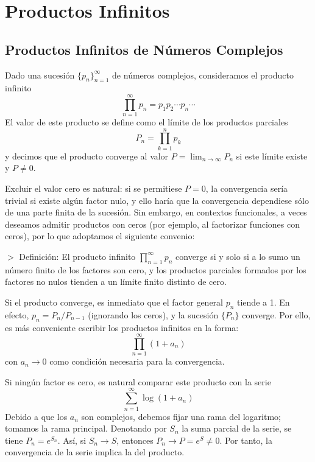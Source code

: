 \documentclass{article}
\theoremstyle{nonumberplain}
\begin{document}
\section*{Productos Infinitos}
\subsection{Productos Infinitos de Números Complejos}

Dado una sucesión \(\{p_n\}_{n=1}^\infty\) de números complejos, consideramos el producto infinito
\[
\prod_{n=1}^{\infty} p_n = p_1 p_2 \cdots p_n \cdots
\]
El valor de este producto se define como el límite de los productos parciales
\[
P_n = \prod_{k=1}^n p_k
\]
y decimos que el producto converge al valor \(P = \lim_{n\to\infty} P_n\) si este límite existe y \(P \neq 0\).

Excluir el valor cero es natural: si se permitiese \(P = 0\), la convergencia sería trivial si existe algún factor nulo, y ello haría que la convergencia dependiese sólo de una parte finita de la sucesión. Sin embargo, en contextos funcionales, a veces deseamos admitir productos con ceros (por ejemplo, al factorizar funciones con ceros), por lo que adoptamos el siguiente convenio:

$>$ Definición: El producto infinito \(\prod_{n=1}^\infty p_n\) converge si y solo si a lo sumo un número finito de los factores son cero, y los productos parciales formados por los factores no nulos tienden a un límite finito distinto de cero.

Si el producto converge, es inmediato que el factor general \(p_n\) tiende a 1. En efecto, \(p_n = P_n / P_{n-1}\) (ignorando los ceros), y la sucesión \(\{P_n\}\) converge. Por ello, es más conveniente escribir los productos infinitos en la forma:
\[
\prod_{n=1}^{\infty} (1+a_n)
\]
con \(a_n \to 0\) como condición necesaria para la convergencia.

Si ningún factor es cero, es natural comparar este producto con la serie
\[
\sum_{n=1}^\infty \log(1 + a_n)
\]
Debido a que los \(a_n\) son complejos, debemos fijar una rama del logaritmo; tomamos la rama principal. Denotando por \(S_n\) la suma parcial de la serie, se tiene \(P_n = e^{S_n}\). Así, si \(S_n \to S\), entonces \(P_n \to P = e^S \neq 0\). Por tanto, la convergencia de la serie implica la del producto.
\end{document}
